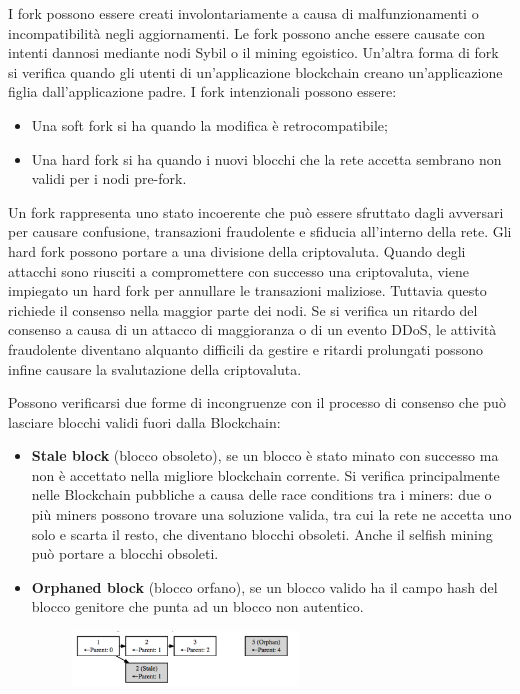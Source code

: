 I fork possono essere creati involontariamente a causa di malfunzionamenti o incompatibilità negli aggiornamenti. Le fork possono anche essere causate con intenti dannosi mediante nodi Sybil o il mining egoistico. Un'altra forma di fork si verifica quando gli utenti di un'applicazione blockchain creano un'applicazione figlia dall'applicazione padre. I fork intenzionali possono essere:
\begin{itemize}
    \item Una soft fork si ha quando la modifica è retrocompatibile;
    \item Una hard fork si ha quando i nuovi blocchi che la rete accetta sembrano non validi per i nodi pre-fork.
\end{itemize}
Un fork rappresenta uno stato incoerente che può essere sfruttato dagli avversari per causare confusione, transazioni fraudolente e sfiducia all'interno della rete. Gli hard fork possono portare a una divisione della criptovaluta. Quando degli attacchi sono riusciti a compromettere con successo una criptovaluta, viene impiegato un hard fork per annullare le transazioni maliziose. Tuttavia questo richiede il consenso nella maggior parte dei nodi. Se si verifica un ritardo del consenso a causa di un attacco di maggioranza o di un evento DDoS, le attività fraudolente diventano alquanto difficili da gestire e ritardi prolungati possono infine causare la svalutazione della criptovaluta.

Possono verificarsi due forme di incongruenze con il processo di consenso che può lasciare blocchi validi fuori dalla Blockchain:
\begin{itemize}
    \item \textbf{Stale block} (blocco obsoleto), se un blocco è stato minato con successo ma non è accettato nella migliore blockchain corrente. Si verifica principalmente nelle Blockchain pubbliche a causa delle race conditions tra i miners: due o più miners possono trovare una soluzione valida, tra cui la rete ne accetta uno solo e scarta il resto, che diventano blocchi obsoleti. Anche il selfish mining può portare a blocchi obsoleti.
    \item \textbf{Orphaned block} (blocco orfano), se un blocco valido ha il campo hash del blocco genitore che punta ad un blocco non autentico.
    
    \begin{figure}[htb!]
        \centering
        \includegraphics[width=6cm]{./Images/cap5/5.1.png}
    \end{figure}
    
\end{itemize}

